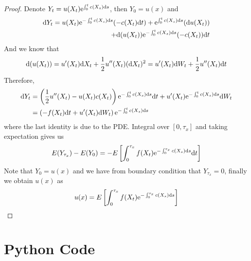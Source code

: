 \documentclass{homework}
\begin{document}
    \problem
    \begin{proof}
        Denote $Y_t=u(X_t)\mathrm e^{\int_0^tc(X_s)\mathrm d s}$,
        then $Y_0=u(x)$ and
        \[\mathrm d Y_t=
        \begin{aligned}[t]
        u(X_t)\mathrm e^{-\int_0^tc(X_s)\mathrm d s}(-c(X_t)\mathrm d t)
        +\mathrm e^{\int_0^tc(X_s)\mathrm d s}(\mathrm d u(X_t))\\
        +\mathrm d(u(X_t))\mathrm e^{-\int_0^tc(X_s)\mathrm d s}(-c(X_t))\mathrm d t
        \end{aligned}\]
        And we know that
        \[\mathrm d(u(X_t))=u'(X_t)\mathrm d X_t+\frac{1}{2}u''(X_t)(\mathrm d X_t)^2
        =u'(X_t)\mathrm d W_t+\frac{1}{2}u''(X_t)\mathrm d t\]
        Therefore,
        \[\begin{aligned}
            \mathrm d Y_t&=
            \left(\frac{1}{2}u''(X_t)-u(X_t)c(X_t)\right)\mathrm e^{-\int_0^tc(X_s)\mathrm d s}\mathrm d t
            +u'(X_t)\mathrm e^{-\int_0^tc(X_s)\mathrm d s}\mathrm d W_t\\
            &=\left(-f(X_t)\mathrm d t+u'(X_t)\mathrm d W_t\right)\mathrm e^{-\int_0^tc(X_s)\mathrm d s}
        \end{aligned}\]
        where the last identity is due to the PDE.
        Integral over $[0,\tau_x]$ and taking expectation gives us
        \[E(Y_{\tau_x})-E(Y_0)
        =-E\left[\int_0^{\tau_x}f(X_t)\mathrm e^{-\int_0^{\tau_x}c(X_s)\mathrm d s}\mathrm d t\right]\]
        Note that $Y_0=u(x)$ and we have from boundary condition that $Y_{\tau_x}=0$,
        finally we obtain $u(x)$ as
        \[u(x)=E\left[\int_0^{\tau_x}f(X_t)\mathrm e^{-\int_0^{\tau_x}c(X_s)\mathrm d s}\right]\]
    \end{proof}

    \appendix
    \section{Python Code}
    
\end{document}
